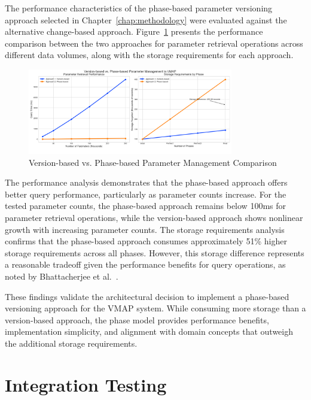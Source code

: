 The performance characteristics of the phase-based parameter versioning approach selected in Chapter~\ref{chap:methodology} were evaluated against the alternative change-based approach. Figure~\ref{fig:versioning-approach-comparison} presents the performance comparison between the two approaches for parameter retrieval operations across different data volumes, along with the storage requirements for each approach.

\begin{figure}[h]
    \centering
    \includegraphics[width=0.8\textwidth]{figures/vmap_versioning_approaches_simplified.png}
    \caption{Version-based vs. Phase-based Parameter Management Comparison}
    \label{fig:versioning-approach-comparison}
\end{figure}

The performance analysis demonstrates that the phase-based approach offers better query performance, particularly as parameter counts increase. For the tested parameter counts, the phase-based approach remains below 100ms for parameter retrieval operations, while the version-based approach shows nonlinear growth with increasing parameter counts. The storage requirements analysis confirms that the phase-based approach consumes approximately 51\% higher storage requirements across all phases. However, this storage difference represents a reasonable tradeoff given the performance benefits for query operations, as noted by Bhattacherjee et al.~\cite{bhattacherjee2015principles}.

These findings validate the architectural decision to implement a phase-based versioning approach for the \ac{VMAP} system. While consuming more storage than a version-based approach, the phase model provides performance benefits, implementation simplicity, and alignment with domain concepts that outweigh the additional storage requirements.

\section{Integration Testing}
\label{sec:integration-testing}


